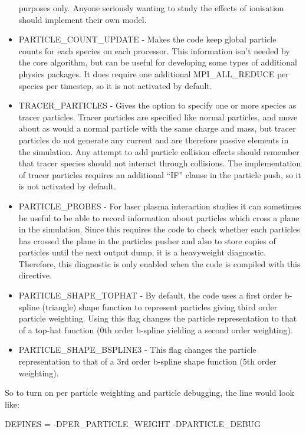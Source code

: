 \begin{itemize}
  purposes only. Anyone seriously wanting to study the effects of ionisation
  should implement their own model.
\item PARTICLE\_COUNT\_UPDATE - Makes the code keep global particle counts for
  each species on each processor. This information isn't needed by the core
  algorithm, but can be useful for developing some types of additional physics
  packages. It does require one additional MPI\_ALL\_REDUCE per species per
  timestep, so it is not activated by default.
\item TRACER\_PARTICLES - Gives the option to specify one or more species as
  tracer particles. Tracer particles are specified like normal particles, and
  move about as would a normal particle with the same charge and mass, but
  tracer particles do not generate any current and are therefore passive
  elements in the simulation. Any attempt to add particle collision effects
  should remember that tracer species should not interact through collisions.
  The implementation of tracer particles requires an additional ``IF'' clause
  in the particle push, so it is not activated by default.
\item PARTICLE\_PROBES - For laser plasma interaction studies it can sometimes
  be useful to be able to record information about particles which cross a
  plane in the simulation. Since this requires the code to check whether each
  particles has crossed the plane in the particles pusher and also to store
  copies of particles until the next output dump, it is a heavyweight
  diagnostic. Therefore, this diagnostic is only enabled when the code is
  compiled with this directive.
\item PARTICLE\_SHAPE\_TOPHAT - By default, the code uses a first order
  b-spline (triangle) shape function to represent particles giving
  third order particle weighting.
  Using this flag changes the particle representation to that of a top-hat
  function (0th order b-spline yielding a second order weighting).
\item PARTICLE\_SHAPE\_BSPLINE3 - This flag changes the particle representation
  to that of a 3rd order b-spline shape function (5th order weighting).
\end{itemize}

So to turn on per particle weighting and particle debugging, the line would
look like:
\begin{boxverbatim}
DEFINES = -DPER_PARTICLE_WEIGHT -DPARTICLE_DEBUG
\end{boxverbatim}

